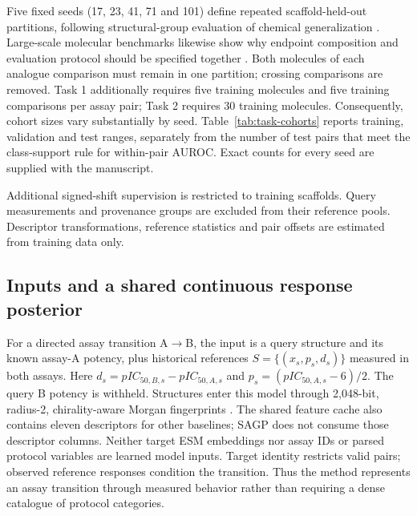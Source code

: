 \documentclass[letterpaper]{article}
\begin{document}
Five fixed seeds (17, 23, 41, 71 and 101) define repeated scaffold-held-out partitions, following structural-group evaluation of chemical generalization \citep{murcko1996,sheridan2013timesplit,wallach2018memorization}. Large-scale molecular benchmarks likewise show why endpoint composition and evaluation protocol should be specified together \citep{mayr2018prediction,wu2018moleculenet}. Both molecules of each analogue comparison must remain in one partition; crossing comparisons are removed. Task 1 additionally requires five training molecules and five training comparisons per assay pair; Task 2 requires 30 training molecules. Consequently, cohort sizes vary substantially by seed. Table~\ref{tab:task-cohorts} reports training, validation and test ranges, separately from the number of test pairs that meet the class-support rule for within-pair AUROC. Exact counts for every seed are supplied with the manuscript.



Additional signed-shift supervision is restricted to training scaffolds. Query measurements and provenance groups are excluded from their reference pools. Descriptor transformations, reference statistics and pair offsets are estimated from training data only.

\subsection{Inputs and a shared continuous response posterior}

For a directed assay transition A$\rightarrow$B, the input is a query structure and its known assay-A potency, plus historical references $S=\{(x_s,p_s,d_s)\}$ measured in both assays. Here $d_s=pIC_{50,B,s}-pIC_{50,A,s}$ and $p_s=(pIC_{50,A,s}-6)/2$. The query B potency is withheld. Structures enter this model through 2,048-bit, radius-2, chirality-aware Morgan fingerprints \citep{rogers2010ecfp}. The shared feature cache also contains eleven descriptors for other baselines; SAGP does not consume those descriptor columns. Neither target ESM embeddings nor assay IDs or parsed protocol variables are learned model inputs. Target identity restricts valid pairs; observed reference responses condition the transition. Thus the method represents an assay transition through measured behavior rather than requiring a dense catalogue of protocol categories.
\end{document}
